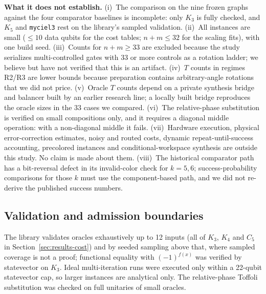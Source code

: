 \documentclass[sigconf, natbib]{acmart}
\begin{document}
\textbf{What it does not establish.}
(i)~The comparison on the nine frozen graphs against the four comparator baselines is incomplete: only $K_3$ is fully checked, and $K_5$ and \texttt{myciel3} rest on the library's sampled validation. %
(ii)~All instances are small ($\le 10$ data qubits for the cost tables; $n+m\le 32$ for the scaling fits), with one build seed. %
(iii)~Counts for $n+m\ge 33$ are excluded because the study serializes multi-controlled gates with 33 or more controls as a rotation ladder; we believe but have not verified that this is an artifact. %
(iv)~$T$ counts in regimes R2/R3 are lower bounds because preparation contains arbitrary-angle rotations that we did not price. %
(v)~Oracle $T$ counts depend on a private synthesis bridge and balancer built by an earlier research line; a locally built bridge reproduces the oracle sizes in the 33 cases we compared. %
(vi)~The relative-phase substitution is verified on small compositions only, and it requires a diagonal middle operation: with a non-diagonal middle it fails. %
(vii)~Hardware execution, physical error-correction estimates, noisy and routed costs, dynamic repeat-until-success accounting, precolored instances and conditional-workspace synthesis are outside this study. No claim is made about them.
(viii)~The historical comparator path has a bit-reversal defect in its invalid-color check for $k=5,6$; success-probability comparisons for those $k$ must use the component-based path, and we did not re-derive the published success numbers. %

\subsection{Validation and admission boundaries}
\label{subsec:validation}
The library validates oracles exhaustively up to 12 inputs (all of $K_3$, $K_4$ and $C_5$ in Section~\ref{sec:results-cost}) and by seeded sampling above that, where sampled coverage is not a proof; %
 functional equality with $(-1)^{f(x)}$ was verified by statevector on $K_3$. %
Ideal multi-iteration runs were executed only within a 22-qubit statevector cap, so larger instances are analytical only. %
The relative-phase Toffoli substitution was checked on full unitaries of small oracles. %
\end{document}
